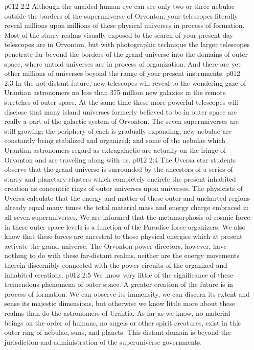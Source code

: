 \vs p012 2:2 Although the unaided human eye can see only two or three nebulae outside the borders of the superuniverse of Orvonton, your telescopes literally reveal millions upon millions of these physical universes in process of formation. Most of the starry realms visually exposed to the search of your present\hyp{}day telescopes are in Orvonton, but with photographic technique the larger telescopes penetrate far beyond the borders of the grand universe into the domains of outer space, where untold universes are in process of organization. And there are yet other millions of universes beyond the range of your present instruments.
\vs p012 2:3 In the not\hyp{}distant future, new telescopes will reveal to the wondering gaze of Urantian astronomers no less than 375 million new galaxies in the remote stretches of outer space. At the same time these more powerful telescopes will disclose that many island universes formerly believed to be in outer space are really a part of the galactic system of Orvonton. The seven superuniverses are still growing; the periphery of each is gradually expanding; new nebulae are constantly being stabilized and organized; and some of the nebulae which Urantian astronomers regard as extragalactic are actually on the fringe of Orvonton and are traveling along with us.
\vs p012 2:4 \pc The Uversa star students observe that the grand universe is surrounded by the ancestors of a series of starry and planetary clusters which completely encircle the present inhabited creation as concentric rings of outer universes upon universes. The physicists of Uversa calculate that the energy and matter of these outer and uncharted regions already equal many times the total material mass and energy charge embraced in all seven superuniverses. We are informed that the metamorphosis of cosmic force in these outer space levels is a function of the Paradise force organizers. We also know that these forces are ancestral to those physical energies which at present activate the grand universe. The Orvonton power directors, however, have nothing to do with these far\hyp{}distant realms, neither are the energy movements therein discernibly connected with the power circuits of the organized and inhabited creations.
\vs p012 2:5 \pc We know very little of the significance of these tremendous phenomena of outer space. A greater creation of the future is in process of formation. We can observe its immensity, we can discern its extent and sense its majestic dimensions, but otherwise we know little more about these realms than do the astronomers of Urantia. As far as we know, no material beings on the order of humans, no angels or other spirit creatures, exist in this outer ring of nebulae, suns, and planets. This distant domain is beyond the jurisdiction and administration of the superuniverse governments.
